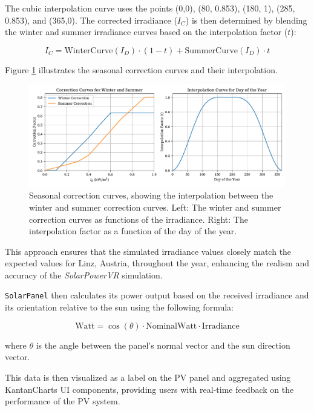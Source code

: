 \documentclass[draft, final]{vutinfth} %
\begin{document}
The cubic interpolation curve uses the points (0,0), (80, 0.853), (180, 1), (285, 0.853), and (365,0). The corrected irradiance ($I_C$) is then determined by blending the winter and summer irradiance curves based on the interpolation factor ($t$):

\begin{equation} \label{eq:seasonal_irradiance}
I_C = \text{WinterCurve}(I_D) \cdot (1 - t) + \text{SummerCurve}(I_D) \cdot t
\end{equation}

Figure \ref{fig:seasonal_correction_curves} illustrates the seasonal correction curves and their interpolation.

\begin{figure}[h]
    \centering
    \includegraphics[width=\textwidth]{graphics/correction.pdf}
    \caption{Seasonal correction curves, showing the interpolation between the winter and summer correction curves. Left: The winter and summer correction curves as functions of the irradiance. Right: The interpolation factor as a function of the day of the year.}
    \label{fig:seasonal_correction_curves}
\end{figure}

This approach ensures that the simulated irradiance values closely match the expected values for Linz, Austria, throughout the year, enhancing the realism and accuracy of the \textit{SolarPowerVR} simulation.

\lstinline|SolarPanel| then calculates its power output based on the received irradiance and its orientation relative to the sun using the following formula:

\begin{equation}
    \text{Watt} = \cos(\theta) \cdot \text{NominalWatt} \cdot \text{Irradiance}
\end{equation}

where $\theta$ is the angle between the panel's normal vector and the sun direction vector.

This data is then visualized as a label on the PV panel and aggregated using KantanCharts UI components, providing users with real-time feedback on the performance of the PV system.
\end{document}
